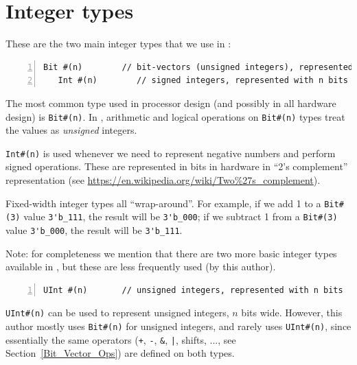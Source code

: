 
\section{Integer types}

\label{BSV_ints}


These are the two main integer types that we use in {\BSV}:

{\footnotesize
\begin{Verbatim}[frame=single, numbers=left]
   Bit #(n)        // bit-vectors (unsigned integers), represented with n bits
   Int #(n)        // signed integers, represented with n bits
\end{Verbatim}
}

The most common type used in processor design (and possibly in all
hardware design) is \verb|Bit#(n)|. In {\BSV}, arithmetic and logical
operations on \verb|Bit#(n)| types treat the values as \emph{unsigned}
integers.

\verb|Int#(n)| is used whenever we need to represent negative numbers
and perform signed operations.  These are represented in bits in
hardware in ``2's complement'' representation (see
\url{https://en.wikipedia.org/wiki/Two%27s_complement}).


Fixed-width integer types all ``wrap-around''.  For example, if we add
1 to a \verb|Bit#(3)| value \verb|3'b_111|, the result will be
\verb|3'b_000|; if we subtract 1 from a \verb|Bit#(3)| value
\verb|3'b_000|, the result will be \verb|3'b_111|.

Note: for completeness we mention that there are two more basic
integer types available in {\BSV}, but these are less frequently used
(by this author).

{\footnotesize
\begin{Verbatim}[frame=single, numbers=left]
   UInt #(n)       // unsigned integers, represented with n bits
\end{Verbatim}
}

\verb|UInt#(n)| can be used to represent unsigned integers, $n$ bits
wide.  However, this author mostly uses \verb|Bit#(n)| for unsigned
integers, and rarely uses \verb|UInt#(n)|, since essentially the same
operators (\verb|+|, \verb|-|, \verb|&|, \verb'|', shifts, ..., see
Section~\ref{Bit_Vector_Ops}) are defined on both types.

